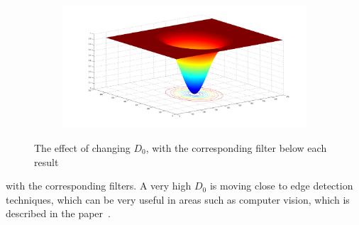 \begin{figure}[h!]
\begin{subfigure}[b]{0.5\textwidth}
				\caption{}
				\label{fig:low_sigma_filter}
			\end{subfigure}%
			\begin{subfigure}[b]{0.5\textwidth}
				\includegraphics[width=\textwidth]{pics/high_sigma_filter.png}
				\caption{}
				\label{fig:high_sigma_filter}
			\end{subfigure}
			\label{fig:sigma}
		\caption{The effect of changing $D_0$, with the corresponding filter below each result}				
		\end{figure}
		with the corresponding filters. A very high $D_0$ is moving close to edge detection
		techniques,
		which can be very useful in areas such as computer vision, which is described in 
		the paper~\cite{Fan20111468}.\\
